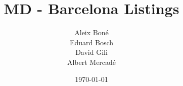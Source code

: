 

\title{MD - \airbnb Barcelona Listings}
\author{
    Aleix Bon\'e\\
    Eduard Bosch\\
    David Gili\\
    Albert Mercad\'e
}
\date{\today}


\graphicspath{{../../analysis/plots/}{images}}

\newcommand{\airbnb}{\emph{Airbnb}\xspace}
\newcommand{\NA}{\emph{NA}\xspace}

\newcommand{\profiling}[3]{
\begin{figure}[H]
    \centering
    \texttt{[image: prof-c3-\#1-\#2]}
    \caption{#3}%
    \label{fig:prof-#1-#2}
\end{figure}
}

\newcommand{\fig}[3][0.6]{
    \begin{figure}[H]
        \centering
        \texttt{[image: \#2]}
        \caption{#3}%
        \label{fig:#2}
    \end{figure}
}

\newcommand{\hibp}[2]{
    \begin{figure}[H]
        \centering
        \texttt{[image: desc-\#1-hi\_bp]}
        \caption{Histogram \& Boxplot of #2}%
        \label{fig:#1}
    \end{figure}
}

\newcommand{\tabn}[2]{
    \begin{table}[H]
        \centering
        \caption{Extended summary statistics of #2}%
        \label{tab:#1}
        
    \end{table}
}

\newcommand{\factorialmap}[2]{
    \begin{figure}[H]
        \centering
        \texttt{[image: pca\_fact-plane\_\#1\_\#2-bi]}
        \caption{PCA plane #1 vs #2}%
        \label{fig:plane_#1-#2}
    \end{figure}
}

\newcommand{\fign}[2]{
    \hibp{#1}{#2}
}

\newcommand{\figf}[2]{
\begin{figure}[H]
    \begin{minipage}{0.39\linewidth}
            \centering
            \texttt{[image: desc-\#1-bar]}
    \end{minipage}
    \begin{minipage}{0.39\linewidth}
            \centering
            \texttt{[image: desc-\#1-pie]}
    \end{minipage}
    \caption{Barplot \& Pie chart of #2}%
    \label{fig:#1}
\end{figure}


%    
}

